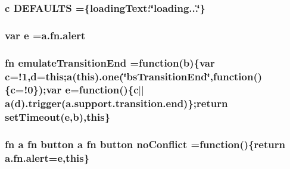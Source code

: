 \subsubsection[{D\+E\+F\+A\+U\+L\+T\+S}]{ {\bf c} D\+E\+F\+A\+U\+L\+T\+S =\{loading\+Text\+:\char`\"{}loading...\char`\"{}\}}\label{bootstrap_8min_8js_a6c1cf0be5e5383617ddc5efdfdc8c651}
\subsubsection[{e}]{\setlength{\rightskip}{0pt plus 5cm}var e ={\bf a.\+fn.\+alert}}\label{bootstrap_8min_8js_ab5902775854a8b8440bcd25e0fe1c120}
\subsubsection[{emulate\+Transition\+End}]{ fn emulate\+Transition\+End =function({\bf b})\{var {\bf c}=!1,{\bf d}=this;{\bf a}(this).one(\char`\"{}bs\+Transition\+End\char`\"{},function()\{{\bf c}=!0\});var {\bf e}=function()\{{\bf c}$\vert$$\vert${\bf a}({\bf d}).trigger(a.\+support.\+transition.\+end)\};return set\+Timeout({\bf e},{\bf b}),this\}}\label{bootstrap_8min_8js_a006fe6a2a254572b367123c6db401ff3}
\subsubsection[{no\+Conflict}]{ fn {\bf a} fn {\bf button} {\bf a} fn {\bf button} no\+Conflict =function()\{return {\bf a.\+fn.\+alert}={\bf e},this\}}\label{bootstrap_8min_8js_ac26971afe341e4079ee34fceab395fc2}
